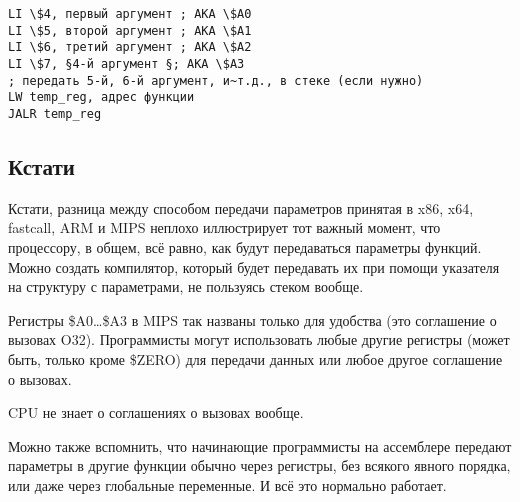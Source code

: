 \begin{lstlisting}[caption=MIPS (соглашение о вызовах O32),style=customasmMIPS]
LI \$4, первый аргумент ; AKA \$A0
LI \$5, второй аргумент ; AKA \$A1
LI \$6, третий аргумент ; AKA \$A2
LI \$7, §4-й аргумент §; AKA \$A3
; передать 5-й, 6-й аргумент, и~т.д., в стеке (если нужно)
LW temp_reg, адрес функции
JALR temp_reg
\end{lstlisting}

\subsection{Кстати}

Кстати, разница между способом передачи параметров принятая в x86, x64, fastcall, ARM и MIPS неплохо иллюстрирует тот важный момент, что процессору, в общем, всё равно, как будут 
передаваться параметры функций. Можно создать компилятор, который будет передавать их при 
помощи указателя на структуру с параметрами, не пользуясь стеком вообще.

Регистры \$A0\dots \$A3 в MIPS так названы только для удобства (это соглашение о вызовах O32).
Программисты могут использовать любые другие регистры (может быть, только кроме \$ZERO) для
передачи данных или любое другое соглашение о вызовах.

\ac{CPU} не знает о соглашениях о вызовах вообще.

Можно также вспомнить, что начинающие программисты на ассемблере передают параметры 
в другие функции обычно через регистры, без всякого явного порядка, или даже через глобальные переменные.
И всё это нормально работает.

